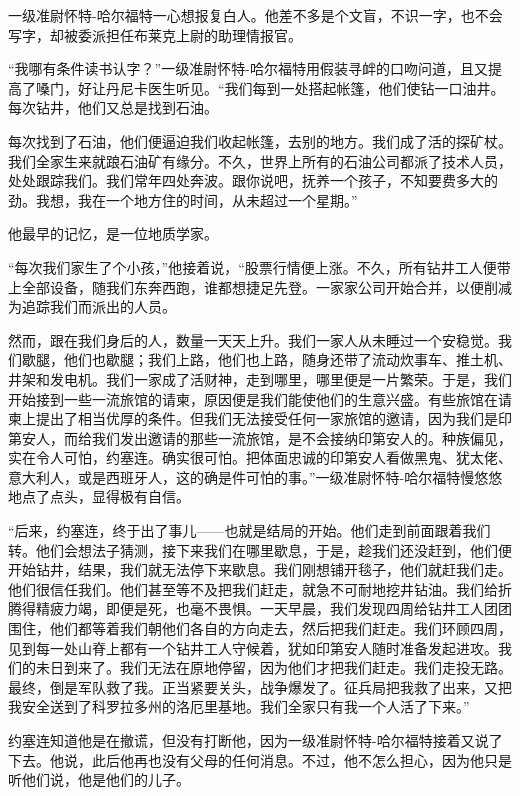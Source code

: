     一级准尉怀特-哈尔福特一心想报复白人。他差不多是个文盲，不识一字，也不会写字，却被委派担任布莱克上尉的助理情报官。

    “我哪有条件读书认字？”一级准尉怀特-哈尔福特用假装寻衅的口吻问道，且又提高了嗓门，好让丹尼卡医生听见。“我们每到一处搭起帐篷，他们使钻一口油井。每次钻井，他们又总是找到石油。

    每次找到了石油，他们便逼迫我们收起帐篷，去别的地方。我们成了活的探矿杖。我们全家生来就踉石油矿有缘分。不久，世界上所有的石油公司都派了技术人员，处处跟踪我们。我们常年四处奔波。跟你说吧，抚养一个孩子，不知要费多大的劲。我想，我在一个地方住的时间，从未超过一个星期。”

    他最早的记忆，是一位地质学家。

    “每次我们家生了个小孩，”他接着说，“股票行情便上涨。不久，所有钻井工人便带上全部设备，随我们东奔西跑，谁都想捷足先登。一家家公司开始合并，以便削减为追踪我们而派出的人员。

    然而，跟在我们身后的人，数量一天天上升。我们一家人从未睡过一个安稳觉。我们歇腿，他们也歇腿；我们上路，他们也上路，随身还带了流动炊事车、推土机、井架和发电机。我们一家成了活财神，走到哪里，哪里便是一片繁荣。于是，我们开始接到一些一流旅馆的请柬，原因便是我们能使他们的生意兴盛。有些旅馆在请柬上提出了相当优厚的条件。但我们无法接受任何一家旅馆的邀请，因为我们是印第安人，而给我们发出邀请的那些一流旅馆，是不会接纳印第安人的。种族偏见，实在令人可怕，约塞连。确实很可怕。把体面忠诚的印第安人看做黑鬼、犹太佬、意大利人，或是西班牙人，这的确是件可怕的事。”一级准尉怀特-哈尔福特慢悠悠地点了点头，显得极有自信。

    “后来，约塞连，终于出了事儿——也就是结局的开始。他们走到前面跟着我们转。他们会想法子猜测，接下来我们在哪里歇息，于是，趁我们还没赶到，他们便开始钻井，结果，我们就无法停下来歇息。我们刚想铺开毯子，他们就赶我们走。他们很信任我们。他们甚至等不及把我们赶走，就急不可耐地挖井钻油。我们给折腾得精疲力竭，即便是死，也毫不畏惧。一天早晨，我们发现四周给钻井工人团团围住，他们都等着我们朝他们各自的方向走去，然后把我们赶走。我们环顾四周，见到每一处山脊上都有一个钻井工人守候着，犹如印第安人随时准备发起进攻。我们的未日到来了。我们无法在原地停留，因为他们才把我们赶走。我们走投无路。最终，倒是军队救了我。正当紧要关头，战争爆发了。征兵局把我救了出来，又把我安全送到了科罗拉多州的洛厄里基地。我们全家只有我一个人活了下来。”
 


    约塞连知道他是在撤谎，但没有打断他，因为一级准尉怀特-哈尔福特接着又说了下去。他说，此后他再也没有父母的任何消息。不过，他不怎么担心，因为他只是听他们说，他是他们的儿子。

